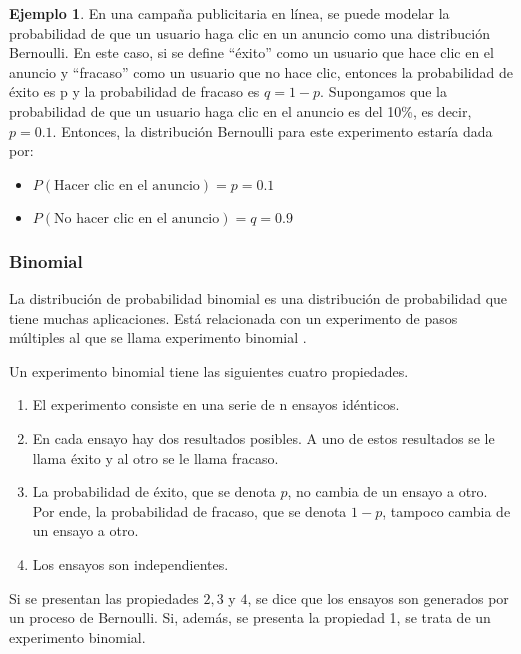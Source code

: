 \documentclass[
]{book}
\providecommand{\tightlist}{%
  \setlength{\itemsep}{0pt}\setlength{\parskip}{0pt}}
\theoremstyle{definition}
\theoremstyle{definition}
\newtheorem{example}{Ejemplo}[chapter]
\theoremstyle{definition}
\theoremstyle{definition}
\theoremstyle{remark}
\begin{document}
\begin{example}

En una campaña publicitaria en línea, se puede modelar la probabilidad de que un usuario haga clic en un anuncio como una distribución Bernoulli. En este caso, si se define ``éxito'' como un usuario que hace clic en el anuncio y ``fracaso'' como un usuario que no hace clic, entonces la probabilidad de éxito es p y la probabilidad de fracaso es \(q = 1 - p\). Supongamos que la probabilidad de que un usuario haga clic en el anuncio es del 10\%, es decir, \(p = 0.1\). Entonces, la distribución Bernoulli para este experimento estaría dada por:

\begin{itemize}
\tightlist
\item
  \(P(\text{Hacer clic en el anuncio}) = p = 0.1\)
\item
  \(P(\text{No hacer clic en el anuncio}) = q = 0.9\)
\end{itemize}

\end{example}

\hypertarget{binomial}{%
\subsubsection*{Binomial}\label{binomial}}

La distribución de probabilidad binomial es una distribución de probabilidad que tiene muchas aplicaciones. Está relacionada con un experimento de pasos múltiples al que se llama experimento binomial \citep[paǵina 200]{anderson}.

Un experimento binomial tiene las siguientes cuatro propiedades.

\begin{enumerate}
\def\labelenumi{\arabic{enumi}.}
\tightlist
\item
  El experimento consiste en una serie de n ensayos idénticos.
\item
  En cada ensayo hay dos resultados posibles. A uno de estos resultados se le llama éxito y al otro se le llama fracaso.
\item
  La probabilidad de éxito, que se denota \(p\), no cambia de un ensayo a otro. Por ende, la probabilidad de fracaso, que se denota \(1 - p\), tampoco cambia de un ensayo a otro.
\item
  Los ensayos son independientes.
\end{enumerate}

Si se presentan las propiedades \(2, 3\) y \(4\), se dice que los ensayos son generados por un proceso de Bernoulli. Si, además, se presenta la propiedad 1, se trata de un experimento binomial.
\end{document}

